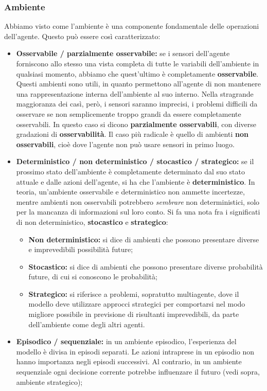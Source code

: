 \documentclass[a4paper,11pt]{article}
\begin{document}
\subsubsection{Ambiente}
Abbiamo visto come l'ambiente è una componente fondamentale delle operazioni dell'agente.
Questo può essere così caratterizzato:
\begin{itemize}
	\item \textbf{Osservabile / parzialmente osservabile:} se i sensori dell'agente forniscono allo stesso una vista completa di tutte le variabili dell'ambiente in qualsiasi momento, abbiamo che quest'ultimo è completamente \textbf{osservabile}. Questi ambienti sono utili, in quanto permettono all'agente di non mantenere una rappresentazione interna dell'ambiente al suo interno. Nella stragrande maggioranza dei casì, però, i sensori saranno imprecisi, i problemi difficili da osservare se non semplicemente troppo grandi da essere completamente osservabili. In questo caso si dicono \textbf{parzialmente osservabili}, con diverse gradazioni di \textbf{osservabilità}. Il caso più radicale è quello di ambienti \textbf{non osservabili}, cioè dove l'agente non può usare sensori in primo luogo.
	\item \textbf{Deterministico / non deterministico / stocastico / strategico:} se il prossimo stato dell'ambiente è completamente determinato dal suo stato attuale e dalle azioni dell'agente, si ha che l'ambiente è \textbf{deterministico}. In teoria, un'ambiente osservabile e deterministico non ammette incertezze, mentre ambienti non osservabili potrebbero \textit{sembrare} non deterministici, solo per la mancanza di informazioni sul loro conto.
		Si fa una nota fra i significati di non deterministico, \textbf{stocastico} e \textbf{strategico}:
		\begin{itemize}
			\item \textbf{Non deterministico:} si dice di ambienti che possono presentare diverse e imprevedibili possibilità future;
			\item \textbf{Stocastico:} si dice di ambienti che possono presentare diverse probabilità future, di cui si conoscono le probabilità;
			\item \textbf{Strategico:} si riferisce a problemi, sopratutto multiagente, dove il modello deve utilizzare approcci strategici per comportarsi nel modo migliore possibile in previsione di risultanti imprevedibili, da parte dell'ambiente come degli altri agenti.
		\end{itemize}
	\item \textbf{Episodico / sequenziale:} in un ambiente episodico, l'esperienza del modello è divisa in episodi separati. Le azioni intraprese in un episodio non hanno importanza negli episodi successivi. Al contrario, in un ambiente sequenziale ogni decisione corrente potrebbe influenzare il futuro (vedi sopra, ambiente strategico);

\end{itemize}
\end{document}
